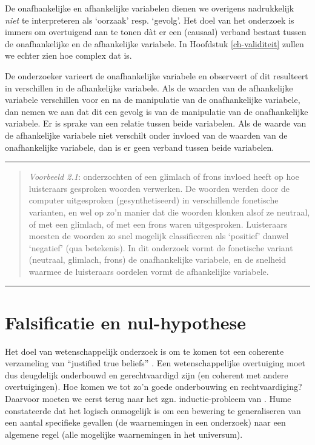 \documentclass[
]{book}
\begin{document}
De onafhankelijke en afhankelijke variabelen dienen we overigens
nadrukkelijk \emph{niet} te interpreteren als `oorzaak' resp. `gevolg'. Het
doel van het onderzoek is immers om overtuigend aan te tonen dàt er een
(causaal) verband bestaat tussen de onafhankelijke en de afhankelijke
variabele. In
Hoofdstuk \ref{ch-validiteit} zullen we echter zien hoe complex dat is.

De onderzoeker varieert de onafhankelijke variabele en observeert of dit
resulteert in verschillen in de afhankelijke variabele. Als de waarden
van de afhankelijke variabele verschillen voor en na de manipulatie van
de onafhankelijke variabele, dan nemen we aan dat dit een gevolg is van
de manipulatie van de onafhankelijke variabele. Er is sprake van een
relatie tussen beide variabelen. Als de waarde van de afhankelijke
variabele niet verschilt onder invloed van de waarden van de
onafhankelijke variabele, dan is er geen verband tussen beide
variabelen.

\begin{center}\rule{0.5\linewidth}{0.5pt}\end{center}

\begin{quote}
\emph{Voorbeeld 2.1}: \citep{QSF12} onderzochten of een
glimlach of frons invloed heeft op hoe luisteraars gesproken woorden
verwerken. De woorden werden door de computer uitgesproken
(gesynthetiseerd) in verschillende fonetische varianten, en wel op zo'n manier dat die woorden klonken alsof ze neutraal, of met een glimlach,
of met een frons waren uitgesproken. Luisteraars moesten de woorden zo
snel mogelijk classificeren als `positief' danwel `negatief' (qua
betekenis). In dit onderzoek vormt de fonetische variant (neutraal,
glimlach, frons) de onafhankelijke variabele, en de snelheid waarmee de
luisteraars oordelen vormt de afhankelijke variabele.
\end{quote}

\begin{center}\rule{0.5\linewidth}{0.5pt}\end{center}

\section{Falsificatie en nul-hypothese}\label{sec:falsificatie}

Het doel van wetenschappelijk onderzoek is om te komen tot een coherente
verzameling van ``justified true beliefs'' \citep{Mort03}. Een
wetenschappelijke overtuiging moet dus deugdelijk onderbouwd en
gerechtvaardigd zijn (en coherent met andere overtuigingen). Hoe komen
we tot zo'n goede onderbouwing en rechtvaardiging? Daarvoor moeten we
eerst terug naar het zgn. inductie-probleem van \citep{Hume1739}. Hume constateerde dat
het logisch onmogelijk is om een bewering te generaliseren van een
aantal specifieke gevallen (de waarnemingen in een onderzoek) naar een
algemene regel (alle mogelijke waarnemingen in het universum).
\end{document}
